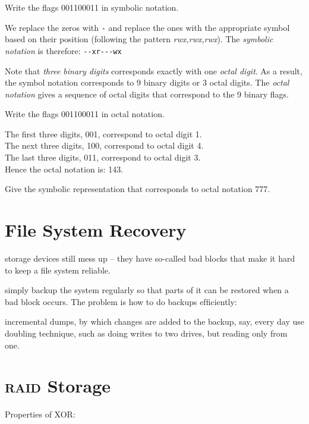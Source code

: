\begin{example}
Write the flags 001100011 in symbolic notation.

We replace the zeros with \lstinline{-} and replace the ones with the 
appropriate symbol based on their position 
(following the pattern \textit{rwx,rwx,rwx}). 
The \textit{symbolic notation} is therefore: \lstinline{--xr---wx}

\end{example}

\frmrule


Note that \textit{three binary digits} corresponds exactly with one \textit{octal digit}. 
As a result, the symbol notation corresponds to 9 binary digits or 3 octal digits. 
The \textit{octal notation} gives a sequence of octal digits that correspond to the 
9 binary flags. 

\frmrule

\begin{example}
Write the flags 001100011 in octal notation.

The first three digits, 001, correspond to octal digit 1. \\
The next three digits, 100, correspond to octal digit 4. \\
The last three digits, 011, correspond to octal digit 3. \\
Hence the octal notation is: 143.
\end{example}

\begin{example}
Give the symbolic representation that corresponds to octal notation 777.
\end{example}




\section{File System Recovery}

storage devices still mess up – they have
so-called bad blocks that make it hard to keep a ﬁle
system reliable.

simply backup the system regularly so that
parts of it can be restored when a bad block occurs.
The problem is how to do backups efﬁciently:

incremental dumps, by which changes are added
to the backup, say, every day
use doubling technique, such as doing writes to
two drives, but reading only from one.




\section{\textsc{raid} Storage}

Properties of XOR: